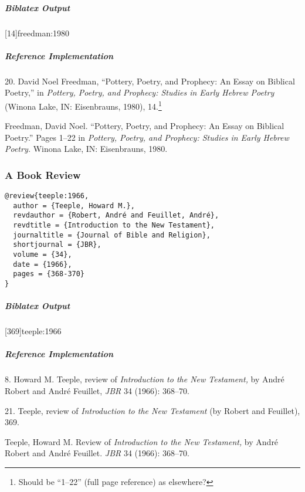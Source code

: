 \documentclass[a4paper]{article}
\newenvironment{biboutput}{%
  \subparagraph{Biblatex Output}
}{\color{black}}
\newenvironment{refimp}{%
  \subparagraph{Reference Implementation}
  \color{reference-colour}
  \rm
}{\par\color{black}}
\begin{document}
\begin{biboutput}
  [14]{freedman:1980}
\end{biboutput}

\begin{refimp}
  \hspace*{\bibindent}20. David Noel Freedman, “Pottery, Poetry, and Prophecy:
  An Essay on Biblical Poetry,” in \emph{Pottery, Poetry, and Prophecy:
  Studies in Early Hebrew Poetry} (Winona Lake, IN: Eisenbrauns, 1980),
  14.\footnote{Should be “1–22” (full page reference) as elsewhere?}

  \hangindent\bibindent Freedman, David Noel. “Pottery, Poetry, and Prophecy:
  An Essay on Biblical Poetry.” Pages 1–22 in \emph{Pottery, Poetry, and
  Prophecy: Studies in Early Hebrew Poetry.} Winona Lake, IN: Eisenbrauns,
  1980.
\end{refimp}

\subsubsection{A Book Review}

\begin{lstlisting}
@review{teeple:1966,
  author = {Teeple, Howard M.},
  revdauthor = {Robert, André and Feuillet, André},
  revdtitle = {Introduction to the New Testament},
  journaltitle = {Journal of Bible and Religion},
  shortjournal = {JBR},
  volume = {34},
  date = {1966},
  pages = {368-370}
}
\end{lstlisting}

\begin{biboutput}
  [369]{teeple:1966}
\end{biboutput}

\begin{refimp}
  \hspace*{\bibindent}8. Howard M. Teeple, review of \emph{Introduction to the
  New Testament,} by André Robert and André Feuillet, \emph{JBR} 34 (1966):
  368–70.
  
  \hspace*{\bibindent}21. Teeple, review of \emph{Introduction to the New
  Testament} (by Robert and Feuillet), 369.

  \hangindent\bibindent Teeple, Howard M. Review of \emph{Introduction to the
  New Testament,} by André Robert and André Feuillet. \emph{JBR} 34 (1966):
  368–70.

\end{refimp}
\end{document}
